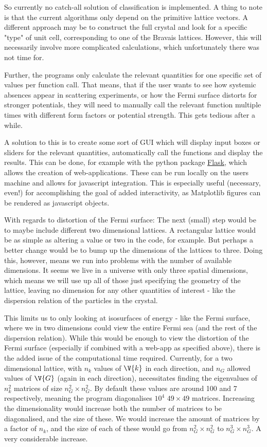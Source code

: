 \documentclass[main.tex]{subfiles}
\begin{document}
	So currently no catch-all solution of classification is implemented. A thing to note is that the current algorithms only depend on the primitive lattice vectors. A different approach may be to construct the full crystal and look for a specific "type" of unit cell, corresponding to one of the Bravais lattices. However, this will necessarily involve more complicated calculations, which unfortunately there was not time for.
	
	Further, the programs only calculate the relevant quantities for one specific set of values per function call. That means, that if the user wants to see how systemic absences appear in scattering experiments, or how the Fermi surface distorts for stronger potentials, they will need to manually call the relevant function multiple times with different form factors or potential strength. This gets tedious after a while.
	
	A solution to this is to create some sort of GUI which will display input boxes or sliders for the relevant quantities, automatically call the functions and display the results. This can be done, for example with the python package \href{http://flask.pocoo.org/}{Flask}, which allows the creation of web-applications. These can be run locally on the users machine and allows for javascript integration. This is especially useful (necessary, even!) for accomplishing the goal of added interactivity, as Matplotlib figures can be rendered as javascript objects.
	
	With regards to distortion of the Fermi surface: The next (small) step would be to maybe include different two dimensional lattices. A rectangular lattice would be as simple as altering a value or two in the code, for example. But perhaps a better change would be to bump up the dimensions of the lattices to three. Doing this, however, means we run into problems with the number of available dimensions. It seems we live in a universe with only three spatial dimensions, which means we will use up all of those just specifying the geometry of the lattice, leaving no dimension for any other quantities of interest - like the dispersion relation of the particles in the crystal.
	
	This limits us to only looking at isosurfaces of energy - like the Fermi surface, where we in two dimensions could view the entire Fermi sea (and the rest of the dispersion relation). While this would be  enough to view the distortion of the Fermi surface (especially if combined with a web-app as specified above), there is the added issue of the computational time required. Currently, for a two dimensional lattice, with $ n_k $ values of $ \V{k} $ in each direction, and $ n_G $ allowed values of $ \V{G} $ (again in each direction), necessitates finding the eigenvalues of $ n_k^2 $ matrices of size $ n_G^2 \times n_G^2 $. By default these values are around 100 and 7 respectively, meaning the program diagonalises $ 10^4 $ $ 49\times 49 $ matrices. Increasing the dimensionality would increase both the number of matrices to be diagonalised, and the size of these. We would increase the amount of matrices by a factor of $ n_k $, and the size of each of these would go from $ n_G^2 \times n_G^2$ to $ n_G^3 \times n_G^3 $. A very considerable increase.
	
\end{document}
